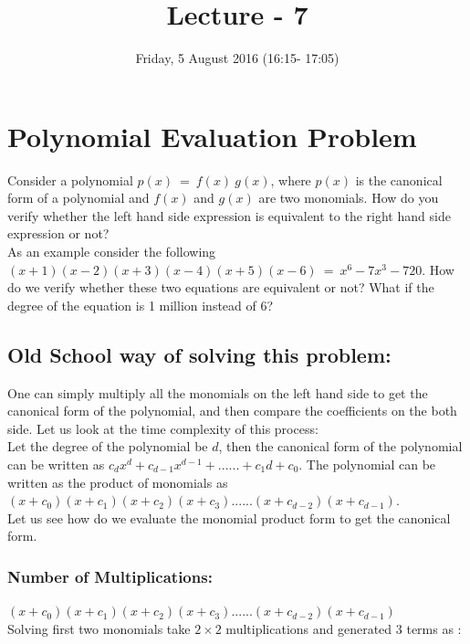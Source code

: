 \documentclass{llncs}
\title{Lecture - 7}
\author{Friday, 5 August 2016 (16:15- 17:05)}
\institute{Polynomial Evaluation Problem}
\begin{document}
\maketitle

\section{Polynomial Evaluation Problem}
Consider a polynomial $p(x)\ =\ f(x)\ g(x)$, where $p(x)$ is the canonical form of a polynomial and $f(x)$ and $g(x)$ are two monomials. How do you verify whether the left hand side expression is equivalent to the right hand side expression or not? \\

As an example consider the following \\

$(x+1)(x-2)(x+3)(x-4)(x+5)(x-6)\ =\ x^6-7x^3-720$. How do we verify whether these two equations are equivalent or not? What if the degree of the equation is 1 million instead of $6$? 

\subsection{Old School way of solving this problem:} 
One can simply multiply all the monomials on the left hand side to get the canonical form of the polynomial, and then compare the coefficients on the both side. Let us look at the time complexity of this process:\\

Let the degree of the polynomial be $d$, then the canonical form of the polynomial can be written as $c_dx^d+ c_{d-1}x^{d-1}+......+c_1d+c_0$. The polynomial can be written as the product of monomials as $(x+c_0)(x+c_1)(x+c_2)(x+c_3)......(x+c_{d-2})(x+c_{d-1})$.\\

Let us see how do we evaluate the monomial product form to get the canonical form.\\

\subsubsection{Number of Multiplications:}

$(x+c_0)(x+c_1)(x+c_2)(x+c_3)......(x+c_{d-2})(x+c_{d-1})$\\

Solving first two monomials take $2 \times 2$ multiplications and generated $3$ terms as :\\
\end{document}
